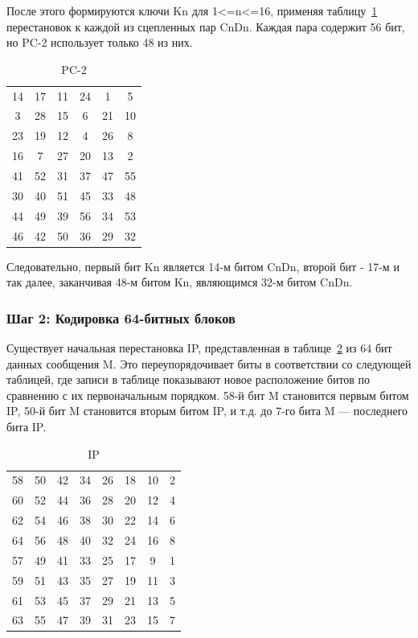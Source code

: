 После этого формируются ключи Kn для 1<=n<=16, применяя таблицу~\ref{tbl:pc-2} перестановок к каждой из сцепленных пар CnDn.
Каждая пара содержит 56 бит, но PC-2 использует только 48 из них.

\begin{table}[ht!]
    \begin{center}
		\captionsetup{justification=raggedright,singlelinecheck=off}
		\caption{\label{tbl:pc-2} PC-2}
        \begin{tabular}{ |c c c c c c| }
                14 & 17 & 11 & 24 & 1 & 5 \\
3 & 28 & 15 & 6 & 21 & 10 \\
23 & 19 & 12 & 4 & 26 & 8 \\
16 & 7 & 27 & 20 & 13 & 2 \\
41 & 52 & 31 & 37 & 47 & 55 \\
30 & 40 & 51 & 45 & 33 & 48 \\
44 & 49 & 39 & 56 & 34 & 53 \\
46 & 42 & 50 & 36 & 29 & 32
        \end{tabular}
    \end{center}
\end{table}

Следовательно, первый бит Kn является 14-м битом CnDn, второй бит - 17-м и так далее, заканчивая 48-м битом Kn, являющимся 32-м битом CnDn.

\subsubsection{Шаг 2: Кодировка 64-битных блоков}

Существует начальная перестановка IP, представленная в таблице~\ref{tbl:ip} из 64 бит данных сообщения M. 
Это переупорядочивает биты в соответствии со следующей таблицей, где записи в таблице показывают новое расположение битов по сравнению с их первоначальным порядком. 
58-й бит M становится первым битом IP, 50-й бит M становится вторым битом IP, и т.д. до 7-го бита M --- последнего бита IP.

\begin{table}[ht!]
    \begin{center}
	\captionsetup{justification=raggedright,singlelinecheck=off}
	\caption{\label{tbl:ip} IP}
        \begin{tabular}{ |c c c c c c c c|}
                58 &    50  & 42  &  34  &  26  & 18  &  10 &   2 \\
60  &  52  & 44  &  36  &  28  & 20  &  12   & 4 \\
62  &  54  & 46  &  38  &  30  & 22  &  14   & 6 \\
64  &  56  & 48  &  40  &  32  & 24  &  16   & 8 \\
57  &  49  & 41  &  33  &  25  & 17  &   9   & 1 \\
59  &  51  & 43  &  35  &  27  & 19  &  11   & 3 \\
61  &  53  & 45  &  37  &  29  & 21  &  13   & 5 \\
63  &  55   & 47 &   39  &  31  & 23  &  15  &  7
        \end{tabular}
    \end{center}
\end{table}


